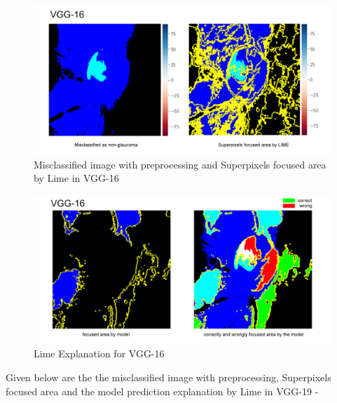 \vspace{5mm}
\begin{figure}[hbt!]
\centering
\includegraphics[scale=0.45]{images/fig-46.png}
\caption{Misclassified image with preprocessing and Superpixels focused area by Lime in VGG-16}
\label{fig:x Misclassified image with preprocessing and Superpixels focused area by Lime in VGG-16}
\end{figure}

\vspace{5mm}
\begin{figure}[hbt!]
\centering
\includegraphics[scale=0.45]{images/fig-47.png}
\caption{Lime Explanation for VGG-16}
\label{fig:x Lime Explanation for VGG-16}
\end{figure}

\newpage
\vspace{5mm}
\noindent Given below are the the misclassified image with preprocessing, Superpixels focused area and the model prediction explanation by Lime in VGG-19 -

